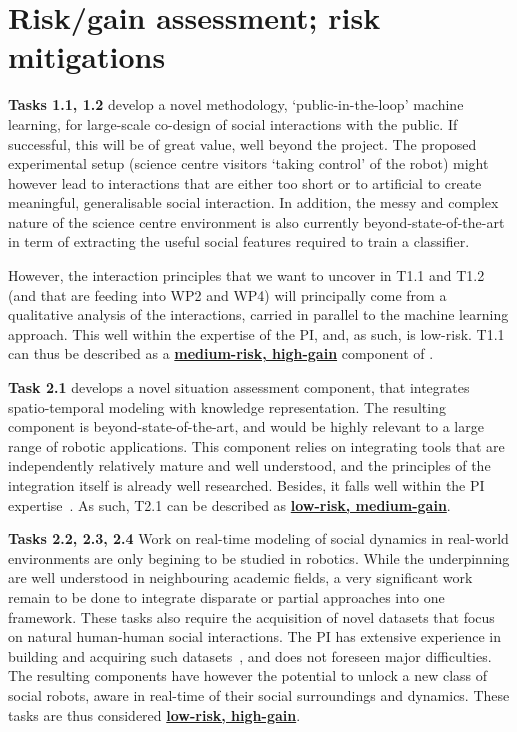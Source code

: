 \section{Risk/gain assessment; risk mitigations}\label{risks}

\textbf{Tasks 1.1, 1.2} develop a novel methodology, `public-in-the-loop' machine
learning, for large-scale co-design of social interactions with the public. If
successful, this will be of great value, well beyond the project. The
proposed experimental setup (science centre visitors `taking control' of the robot)
might however lead to interactions that are either too short or to artificial to
create meaningful, generalisable social interaction. In addition, the messy and
complex nature of the science centre environment is also currently beyond-state-of-the-art
in term of extracting the useful social features required to train a classifier.

However, the interaction principles that we want to uncover in T1.1 and T1.2
(and that are feeding into WP2 and WP4) will principally come from a qualitative
analysis of the interactions, carried in parallel to the machine learning
approach. This well within the expertise of the PI, and, as such, is low-risk.
T1.1 can thus be described as a \ul{\bf medium-risk, high-gain} component of
\project.

\vspace{1em}

\textbf{Task 2.1} develops a novel situation assessment component, that
integrates spatio-temporal modeling with knowledge representation. The resulting
component is beyond-state-of-the-art, and would be highly relevant to a large range
of robotic applications. This component relies on integrating tools that are
independently relatively mature and well understood, and the principles of the
integration itself is already well researched. Besides, it falls well within the
PI
expertise~\cite{lemaignan2018underworlds,sallami2019simulation,lemaignan2010oro}.
As such, T2.1 can be described as \ul{\bf low-risk, medium-gain}.

\textbf{Tasks 2.2, 2.3, 2.4} Work on real-time modeling of social dynamics in
real-world environments are only begining to be studied in robotics. While the
underpinning are well understood in neighbouring academic fields, a very
significant work remain to be done to integrate disparate or partial approaches
into one framework. These tasks also require the acquisition of novel datasets
that focus on natural human-human social interactions. The PI has extensive
experience in building and acquiring such
datasets~\cite{lemaignan2018pinsoro,sallami2020unexpected}, and does not
foreseen major difficulties. The resulting components have however the potential
to unlock a new class of social robots, aware in real-time of their social
surroundings and dynamics.  These tasks are thus considered \ul{\bf low-risk,
high-gain}.

